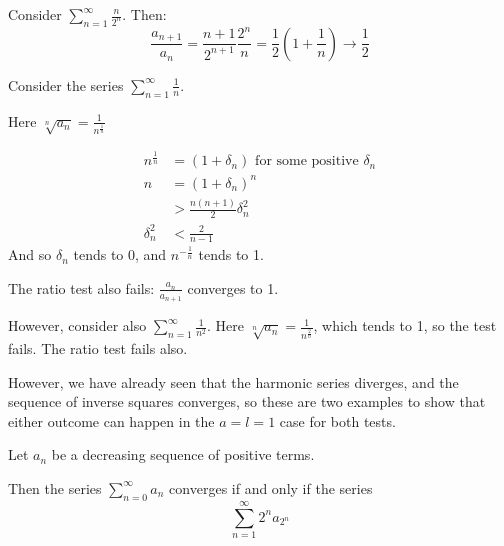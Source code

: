 \documentclass[../Main.tex]{subfiles}
\begin{document}
\begin{example}
    Consider $\sum_{n=1}^{\infty} \frac{n}{2^n}$. Then:
    \begin{equation*}
        \frac{a_{n+1}}{a_n} = \frac{n+1}{2^{n+1}} \frac{2^n}{n} = \frac{1}{2} \left(1 + \frac{1}{n}\right) \to \frac{1}{2}
    \end{equation*}
\end{example}
\begin{example}
    Consider the series $\sum_{n=1}^\infty \frac{1}{n}$.\par
    Here $\sqrt[n]{a_n} = \frac{1}{n^{\frac{1}{n}}}$\par
    \begin{align*}
        n^{\frac{1}{n}} &= (1 + \delta_n) \text{ for some positive } \delta_n \\
        n &= (1 + \delta_n)^n \\
        &>\frac{n(n+1)}{2} \delta_n^2 \\
        \delta_n^2 &< \frac{2}{n-1}
    \end{align*}
    And so $\delta_n$ tends to $0$, and $n^{-\frac{1}{n}}$ tends to 1.\par
    The ratio test also fails: $\frac{a_n}{a_{n+1}}$ converges to 1.\par
    However, consider also $\sum_{n=1}^\infty \frac{1}{n^2}$. Here $\sqrt[n]{a_n} = \frac{1}{n^{\frac{2}{n}}}$, which tends to 1, so the test fails. The ratio test fails also.\par
    However, we have already seen that the harmonic series diverges, and the sequence of inverse squares converges, so these are two examples to show that either outcome can happen in the $a = l = 1$ case for both tests.
    \label{exRootAndRatioFail}
\end{example}
\begin{theorem}
    Let $a_n$ be a decreasing sequence of positive terms.\par
    Then the series $\sum_{n=0}^\infty a_n$ converges if and only if the series
    \begin{equation*}
        \sum_{n=1}^\infty 2^n a_{2^n}
    \end{equation*}
    \label{thmCauchyCondensation}
\end{theorem}
\end{document}
